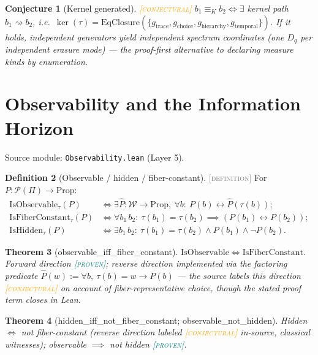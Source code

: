 \documentclass[11pt]{article}
\newcommand{\PROVEN}{\textcolor{teal}{\textsc{[proven]}}}
\newcommand{\DEFINITION}{\textcolor{gray}{\textsc{[definition]}}}
\newcommand{\CONJECTURAL}{\textcolor{orange}{\textsc{[conjectural]}}}
\newcommand{\PT}{\Pi}                          %
\newcommand{\PS}{\mathcal{P}(\PT)}             %
\newcommand{\WS}{\mathcal{W}}                  %
\newcommand{\tmap}{\tau}                       %
\newcommand{\kerEq}{\equiv_{K}}                %
\theoremstyle{plain}
\newtheorem{theorem}{Theorem}[section]
\newtheorem{conjecture}[theorem]{Conjecture}
\theoremstyle{definition}
\newtheorem{definition}[theorem]{Definition}
\begin{document}
\begin{conjecture}[Kernel generated]\CONJECTURAL\;
$b_1 \kerEq b_2 \iff \exists$ kernel path $b_1 \rightsquigarrow b_2$,
i.e.\ $\ker(\tmap) = \mathrm{EqClosure}(\{g_{\mathrm{trace}},
g_{\mathrm{choice}}, g_{\mathrm{hierarchy}}, g_{\mathrm{temporal}}\})$.
If it holds, independent generators yield independent spectrum coordinates
(one $D_q$ per independent erasure mode) --- the proof-first alternative to
declaring measure kinds by enumeration.
\end{conjecture}

\section{Observability and the Information Horizon}
\label{sec:observability}
Source module: \texttt{Observability.lean} (Layer 5).

\begin{definition}[Observable / hidden / fiber-constant]\DEFINITION\;
For $P : \PS \to \mathrm{Prop}$:
\begin{align*}
  \mathrm{IsObservable}_\tmap(P)
    &\iff \exists \hat{P} : \WS \to \mathrm{Prop},\
      \forall b:\ P(b) \leftrightarrow \hat{P}(\tmap(b)); \\
  \mathrm{IsFiberConstant}_\tmap(P)
    &\iff \forall b_1\, b_2:\ \tmap(b_1) = \tmap(b_2)
      \implies (P(b_1) \leftrightarrow P(b_2)); \\
  \mathrm{IsHidden}_\tmap(P)
    &\iff \exists b_1\, b_2:\ \tmap(b_1) = \tmap(b_2)
      \wedge P(b_1) \wedge \neg P(b_2).
\end{align*}
\end{definition}

\begin{theorem}[observable\_iff\_fiber\_constant]\;
$\mathrm{IsObservable} \iff \mathrm{IsFiberConstant}$.
Forward direction \PROVEN; reverse direction implemented via the factoring
predicate $\hat{P}(w) := \forall b,\ \tmap(b) = w \to P(b)$ --- the source
labels this direction \CONJECTURAL{} on account of fiber-representative
choice, though the stated proof term closes in Lean.
\end{theorem}

\begin{theorem}[hidden\_iff\_not\_fiber\_constant; observable\_not\_hidden]\;
Hidden $\iff$ not fiber-constant (reverse direction labeled \CONJECTURAL{}
in-source, classical witnesses); observable $\implies$ not hidden \PROVEN.
\end{theorem}
\end{document}
